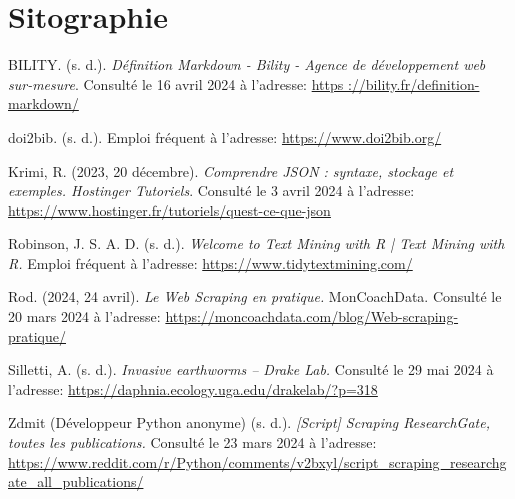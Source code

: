 \documentclass{book}
\begin{document}
\newpage
\mbox{}

\chapter*{Sitographie}
\begin{enumerate}[label={[\arabic*]}]
    \item {}\label{site1}BILITY. (s. d.). \textit{Définition Markdown - Bility - Agence de développement web sur-mesure}. Consulté le 16 avril 2024 à l'adresse: \url{https ://bility.fr/definition-markdown/}
    
    \item {}\label{doi2bib} doi2bib. (s. d.). Emploi fréquent à l'adresse: \url{https://www.doi2bib.org/}
    
    \item {}\label{site2}Krimi, R. (2023, 20 décembre). \textit{Comprendre JSON : syntaxe, stockage et exemples. Hostinger Tutoriels}. Consulté le 3 avril 2024 à l'adresse: \url{https://www.hostinger.fr/tutoriels/quest-ce-que-json}
    
    \item {}\label{site3}Robinson, J. S. A. D. (s. d.). \textit{Welcome to Text Mining with R | Text Mining with R.} Emploi fréquent à l'adresse: \url{https://www.tidytextmining.com/}
    
    \item {}\label{site5}Rod. (2024, 24 avril). \textit{Le Web Scraping en pratique.} MonCoachData. Consulté le 20 mars 2024 à l'adresse: \url{https://moncoachdata.com/blog/Web-scraping-pratique/}
    
    \item {}\label{site4}Silletti, A. (s. d.). \textit{Invasive earthworms – Drake Lab.} Consulté le 29 mai 2024 à l'adresse: \url{https://daphnia.ecology.uga.edu/drakelab/?p=318} 

    \item {}\label{site6} Zdmit (Développeur Python anonyme) (s. d.). \textit{[Script] Scraping ResearchGate, toutes les publications.} Consulté le 23 mars 2024 à l'adresse: \url{https://www.reddit.com/r/Python/comments/v2bxyl/script_scraping_researchgate_all_publications/}

\end{enumerate}

\end{document}
